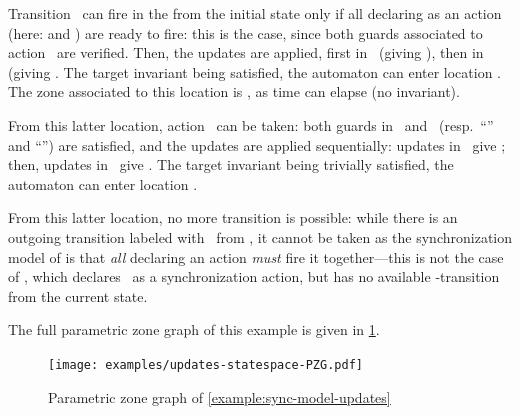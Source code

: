 \begin{example}
Transition~ can fire in the \NIPTA{} from the initial state only if all \IPTA{} declaring  as an action (here:  and ) are ready to fire: this is the case, since both guards associated to action~ are verified.
Then, the updates are applied, first in~ (giving ), then in~ (giving .
The target invariant being satisfied, the automaton can enter location .
The zone associated to this location is , as time can elapse (no invariant).

From this latter location, action~ can be taken:
both guards in~ and~ (resp.\ ``'' and ``'') are satisfied, and the updates are applied sequentially:
updates in~ give ;
then, updates in~ give .
The target invariant being trivially satisfied, the automaton can enter location .

From this latter location, no more transition is possible: while there is an outgoing transition labeled with~ from , it cannot be taken as the synchronization model of \imitator{} is that \emph{all} \IPTA{} declaring an action \emph{must} fire it together---this is not the case of , which declares~ as a synchronization action, but has no available -transition from the current state.

The full parametric zone graph of this example is given in \cref{example:sync-model-updates-PZG}.

\end{example}


\begin{figure}
	\centering
	\texttt{[image: examples/updates-statespace-PZG.pdf]}

	\caption{Parametric zone graph of \cref{example:sync-model-updates}}
	\label{example:sync-model-updates-PZG}
\end{figure}




